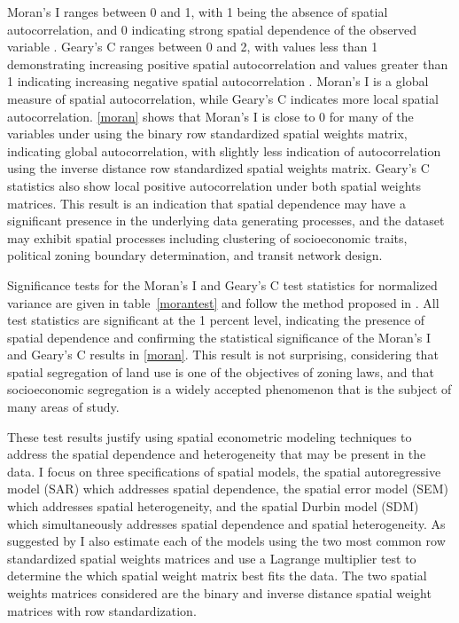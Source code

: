 Moran's I ranges between 0 and 1, with 1 being the absence of spatial autocorrelation, and 0 indicating strong spatial dependence of the observed variable \cite{Moran1950}.  Geary's C ranges between 0 and 2, with values less than 1 demonstrating increasing positive spatial autocorrelation and values greater than 1 indicating increasing negative spatial autocorrelation \cite{Geary1954}.  Moran's I is a global measure of spatial autocorrelation, while Geary's C indicates more local spatial autocorrelation. \autoref{moran} shows that Moran's I is close to 0 for many of the variables under using the binary row standardized spatial weights matrix, indicating global autocorrelation, with slightly less indication of autocorrelation using the inverse distance row standardized spatial weights matrix.  Geary's C statistics also show local positive autocorrelation under both spatial weights matrices.  This result is an indication that spatial dependence may have a significant presence in the underlying data generating processes, and the dataset may exhibit spatial processes including clustering of socioeconomic traits, political zoning  boundary determination, and transit network design.  

\begin{singlespace}\small
		
\end{singlespace}

Significance tests for the Moran's I and Geary's C test statistics for normalized variance are given in table~\autoref{morantest} and follow the method proposed in \cite{cliff1968}.  All test statistics are significant at the 1 percent level, indicating the presence of spatial dependence and confirming the statistical significance of the Moran's I and Geary's C results in \autoref{moran}.  This result is not surprising, considering that spatial segregation of land use is one of the objectives of zoning laws, and that socioeconomic segregation is a widely accepted phenomenon that is the subject of many areas of study.  




\begin{singlespace}\small 
	
\end{singlespace}

These test results justify using spatial econometric modeling techniques to address the spatial dependence and heterogeneity that may be present in the data.  I focus on three specifications of spatial models, the spatial autoregressive model (SAR) which addresses spatial dependence, the spatial error model (SEM) which addresses spatial heterogeneity, and the spatial Durbin model (SDM) which simultaneously addresses spatial dependence and spatial heterogeneity.  As suggested by \cite{LeSage2009} I also estimate each of the models using the two most common row standardized spatial weights matrices and use a Lagrange multiplier test to determine the which spatial weight matrix best fits the data.  The two spatial weights matrices considered are the binary and inverse distance spatial weight matrices with row standardization. 

